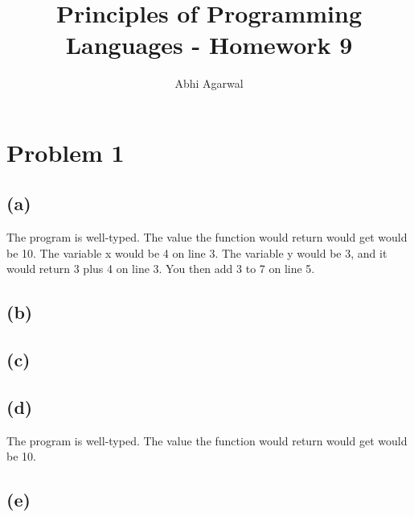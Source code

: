 \documentclass[11pt, oneside]{article}
\title{Principles of Programming Languages - Homework 9}
\author{Abhi Agarwal}
\date{}
\begin{document}
\maketitle
\section{Problem 1}
\subsection*{(a)} The program is well-typed. The value the function would return would get would be 10. The variable x would be 4 on line 3. The variable y would be 3, and it would return 3 plus 4 on line 3. You then add 3 to 7 on line 5.
\subsection*{(b)} 
\subsection*{(c)} 
\subsection*{(d)} The program is well-typed. The value the function would return would get would be 10. 
\subsection*{(e)} 
\end{document}
